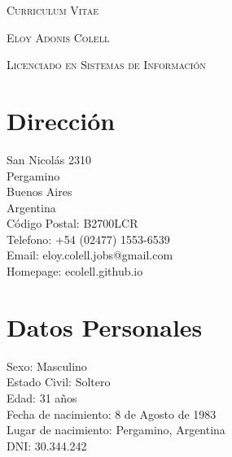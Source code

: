 \documentclass[a4paper]{article}
\begin{document}
\pagestyle{plain}

\begin{center}
\huge{\textsc{Curriculum Vitae}}
\vspace{\baselineskip}

\Large{\textsc{Eloy Adonis Colell}}
\vspace{\baselineskip}

\small{\textsc{Licenciado en Sistemas de Información}}
\end{center}
\vspace{1.5\baselineskip}

\section{Dirección}
\begin{flushleft}
San Nicolás 2310 \\
Pergamino \\
Buenos Aires \\
Argentina \\
Código Postal: B2700LCR \\
Telefono: +54 (02477) 1553-6539 \\
Email: eloy.colell.jobs@gmail.com \\
Homepage: ecolell.github.io\\
\end{flushleft}

\section{Datos Personales}
\begin{flushleft}
Sexo: Masculino \\
Estado Civil: Soltero \\
Edad: 31 años \\
Fecha de nacimiento: 8 de Agosto de 1983 \\
Lugar de nacimiento: Pergamino, Argentina \\
DNI: 30.344.242 \\
\end{flushleft}
\end{document}
